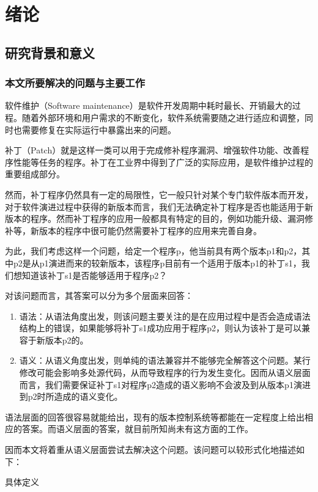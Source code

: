 \chapter{绪论}
\section{研究背景和意义}
\subsection{本文所要解决的问题与主要工作}
软件维护（Software maintenance）是软件开发周期中耗时最长、开销最大的过程。随着外部环境和用户需求的不断变化，软件系统需要随之进行适应和调整，同时也需要修复在实际运行中暴露出来的问题。

补丁（Patch）就是这样一类可以用于完成修补程序漏洞、增强软件功能、改善程序性能等任务的程序。补丁在工业界中得到了广泛的实际应用，是软件维护过程的重要组成部分。

然而，补丁程序仍然具有一定的局限性，它一般只针对某个专门软件版本而开发，对于软件演进过程中获得的新版本而言，我们无法确定补丁程序是否也能适用于新版本的程序。然而补丁程序的应用一般都具有特定的目的，例如功能升级、漏洞修补等，新版本的程序中很可能仍然需要补丁程序的应用来完善自身。

为此，我们考虑这样一个问题，给定一个程序p，他当前具有两个版本p1和p2，其中p2是从p1演进而来的较新版本，该程序p目前有一个适用于版本p1的补丁s1，我们想知道该补丁s1是否能够适用于程序p2？

对该问题而言，其答案可以分为多个层面来回答：

\begin{enumerate}
	\item
	语法：从语法角度出发，则该问题主要关注的是在应用过程中是否会造成语法结构上的错误，如果能够将补丁s1成功应用于程序p2，则认为该补丁是可以兼容于新版本p2的。
	\item
	语义：从语义角度出发，则单纯的语法兼容并不能够完全解答这个问题。某行修改可能会影响多处源代码，从而导致程序的行为发生变化。因而从语义层面而言，我们需要保证补丁s1对程序p2造成的语义影响不会波及到从版本p1演进到p2时所造成的语义变化。
\end{enumerate}

语法层面的回答很容易就能给出，现有的版本控制系统等都能在一定程度上给出相应的答案。而语义层面的答案，就目前所知尚未有这方面的工作。

因而本文将着重从语义层面尝试去解决这个问题。该问题可以较形式化地描述如下：

\begin{definition}
	具体定义
\end{definition}

